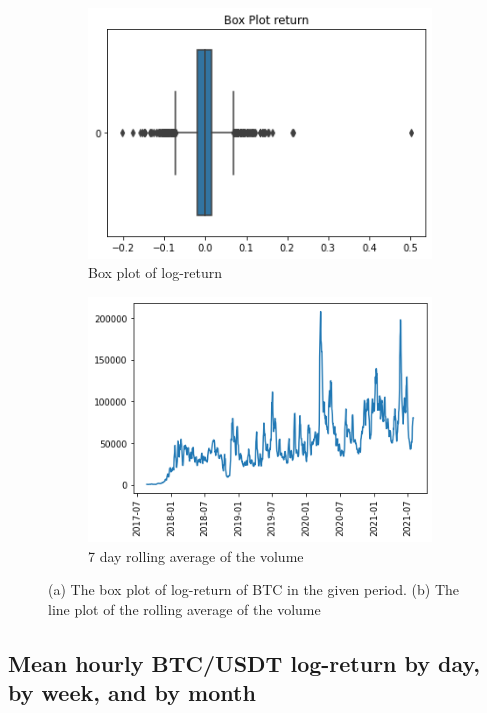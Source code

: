 \documentclass[twoside]{report}
\begin{document}
\begin{spacing}{1}
\begin{figure}[!htbp]
\centering
\begin{subfigure}{.5\textwidth}
    \centering
    \includegraphics[width=.9\linewidth]{Images/Box Plot of Return.png}
    \caption{Box plot of log-return}
    \label{log return box}
\end{subfigure}%
\begin{subfigure}{.5\textwidth}
    \centering
    \includegraphics[width=.9\linewidth]{Images/Volume Rolling Average.png}
    \caption{7 day rolling average of the volume}
    \label{7day rolling volume}
\end{subfigure}
\caption{(a) The box plot of log-return of BTC in the given period. (b) The line plot of the rolling average of the volume}
\label{fig:test}
\end{figure}

\subsection{Mean hourly BTC/USDT log-return by day, by week, and by month}


\end{spacing}
\end{document}
